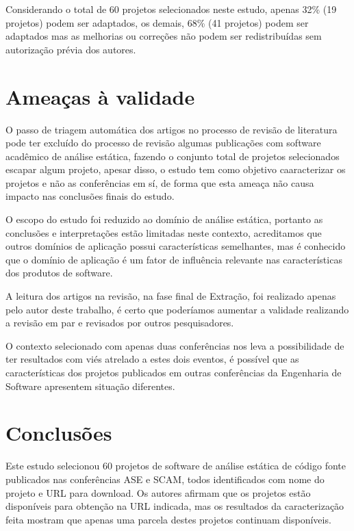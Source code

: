 Considerando o total de 60 projetos selecionados neste estudo, apenas 32\% (19
projetos) podem ser adaptados, os demais, 68\% (41 projetos) podem ser
adaptados mas as melhorias ou correções não podem ser redistribuídas sem
autorização prévia dos autores.

\section{Ameaças à validade}

O passo de triagem automática dos artigos no processo de revisão de literatura
pode ter excluído do processo de revisão algumas publicações com software
acadêmico de análise estática, fazendo o conjunto total de projetos
selecionados escapar algum projeto, apesar disso, o estudo tem como objetivo
caaracterizar os projetos e não as conferências em sí, de forma que esta ameaça
não causa impacto nas conclusões finais do estudo.

O escopo do estudo foi reduzido ao domínio de análise estática, portanto as
conclusões e interpretações estão limitadas neste contexto, acreditamos que
outros domínios de aplicação possui características semelhantes, mas é
conhecido que o domínio de aplicação é um fator de influência relevante nas
características dos produtos de software.

A leitura dos artigos na revisão, na fase final de Extração, foi realizado
apenas pelo autor deste trabalho, é certo que poderíamos aumentar a validade
realizando a revisão em par e revisados por outros pesquisadores.

O contexto selecionado com apenas duas conferências nos leva a possibilidade de
ter resultados com viés atrelado a estes dois eventos, é possível que as
características dos projetos publicados em outras conferências da Engenharia de
Software apresentem situação diferentes.

\section{Conclusões} \label{estudo1:conclusoes}

Este estudo selecionou 60 projetos de software de análise estática de código
fonte publicados nas conferências ASE e SCAM, todos identificados com nome do
projeto e URL para download. Os autores afirmam que os projetos estão
disponíveis para obtenção na URL indicada, mas os resultados da caracterização
feita mostram que apenas uma parcela destes projetos continuam disponíveis.

